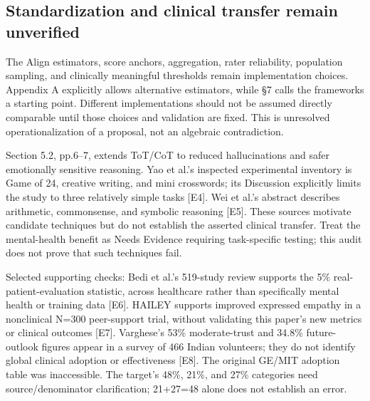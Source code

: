 \documentclass[10pt]{article}
\begin{document}
\subsection*{Standardization and clinical transfer remain unverified}
The Align estimators, score anchors, aggregation, rater reliability, population sampling, and clinically meaningful thresholds remain implementation choices. Appendix A explicitly allows alternative estimators, while §7 calls the frameworks a starting point. Different implementations should not be assumed directly comparable until those choices and validation are fixed. This is unresolved operationalization of a proposal, not an algebraic contradiction.\par
Section 5.2, pp.6–7, extends ToT/CoT to reduced hallucinations and safer emotionally sensitive reasoning. Yao et al.’s inspected experimental inventory is Game of 24, creative writing, and mini crosswords; its Discussion explicitly limits the study to three relatively simple tasks [E4]. Wei et al.’s abstract describes arithmetic, commonsense, and symbolic reasoning [E5]. These sources motivate candidate techniques but do not establish the asserted clinical transfer. Treat the mental-health benefit as Needs Evidence requiring task-specific testing; this audit does not prove that such techniques fail.\par
Selected supporting checks: Bedi et al.’s 519-study review supports the 5\% real-patient-evaluation statistic, across healthcare rather than specifically mental health or training data [E6]. HAILEY supports improved expressed empathy in a nonclinical N=300 peer-support trial, without validating this paper’s new metrics or clinical outcomes [E7]. Varghese’s 53\% moderate-trust and 34.8\% future-outlook figures appear in a survey of 466 Indian volunteers; they do not identify global clinical adoption or effectiveness [E8]. The original GE/MIT adoption table was inaccessible. The target’s 48\%, 21\%, and 27\% categories need source/denominator clarification; 21+27=48 alone does not establish an error.\par
\end{document}
